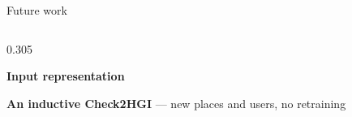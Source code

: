 \documentclass{beamer}
\begin{document}
\begin{frame}{Future work}
    \vspace{0pt}%
    \vfill
    {\footnotesize
    \begin{columns}[t,onlytextwidth]
        \begin{column}{0.305\textwidth}
            \raggedright
            {\color{primaryshade}\textbf{Input representation}}\par
            \vspace{0.6mm}{\color{primaryshade}\rule{\linewidth}{0.6pt}}\par\vspace{1.4mm}
            \textbf{An inductive Check2HGI} --- new places and users, no retraining\par

\end{column}
\end{columns}}
\end{frame}
\end{document}
